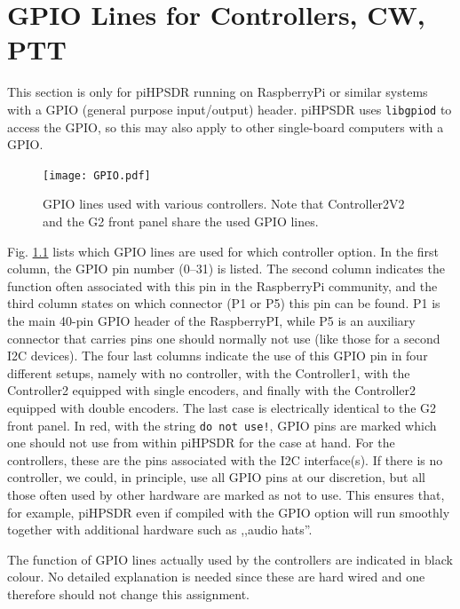 \documentclass[12pt]{book}
\def\pH{pi\-HPSDR }
\begin{document}
\chapter[RaspPi GPIO lines]{GPIO Lines for Controllers, CW, PTT}
\label{sec:gpio}
This section is only for \pH running on RaspberryPi or similar systems with a GPIO (general purpose
input/output) header. \pH uses \texttt{libgpiod} to access the GPIO, so this may also apply to
other single-board computers with a GPIO.

\begin{figure}[ht!]
\center
\texttt{[image: GPIO.pdf]}
\caption{GPIO lines used with various controllers. Note that Controller2V2 and the G2 front panel
share the used GPIO lines.}
\label{fig:GPIO}
\end{figure}

Fig. \ref{fig:GPIO} lists which GPIO lines are used for which controller option. In the first column,
the GPIO pin number (0--31) is listed. The second column indicates the function often
associated with this pin in the RaspberryPi community, and the third column states on which connector
(P1 or P5) this pin can be found. P1 is the main 40-pin GPIO header of the RaspberryPI, while P5 is
an auxiliary connector that carries pins one should normally not use (like those for a second I2C
devices). The four last columns indicate the use of this GPIO pin in four different setups, namely
with no controller, with the Controller1, with the Controller2 equipped with single encoders, and
finally with the Controller2 equipped with double encoders. The last case is electrically identical to
the G2 front panel. In red, with the string \texttt{do not use!}, GPIO pins are marked which one should
not use from within \pH for the case at hand. For the controllers, these are the pins associated
with the I2C interface(s). If there is no controller, we could, in principle, use all GPIO pins at our
discretion, but all those often used by other hardware are marked as not to use. This ensures that,
for example, \pH even if compiled with the GPIO option will run smoothly together with additional
hardware such as ,,audio hats''.

The function of GPIO lines actually used by the controllers are indicated in black colour. No detailed
explanation is needed since these are hard wired and one therefore should not change this assignment.
\end{document}
